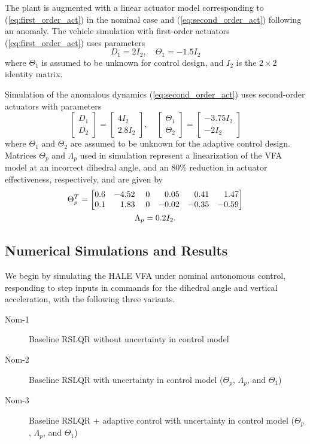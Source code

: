 \documentclass[english]{ifacconf}
\begin{document}
The plant is augmented with a linear actuator model corresponding to (\ref{eq:first_order_act}) in the nominal case and (\ref{eq:second_order_act}) following an anomaly. The vehicle simulation with first-order actuators (\ref{eq:first_order_act}) uses parameters
\begin{equation}
D_1 = 2 I_2, \quad \Theta_1 = -1.5 I_2
\end{equation}
where $\Theta_1$ is assumed to be unknown for control design, and $I_2$ is the $2 \times 2$ identity matrix. 

Simulation of the anomalous dynamics (\ref{eq:second_order_act}) uses second-order actuators with parameters
\begin{equation}
\begin{bmatrix}
	D_1 \\ D_2
\end{bmatrix} = \begin{bmatrix}
	4 I_2 \\ 2.8 I_2
\end{bmatrix}, \quad \begin{bmatrix}
	\Theta_1 \\ \Theta_2 
\end{bmatrix} = \begin{bmatrix}
	-3.75 I_2 \\ -2 I_2
\end{bmatrix}
\end{equation}
where $\Theta_1$ and $\Theta_2$ are assumed to be unknown for the adaptive control design. Matrices $\Theta_p$ and $\Lambda_p$ used in simulation represent a linearization of the VFA model at an incorrect dihedral angle, and an 80\% reduction in actuator effectiveness, respectively, and are given by
\begin{equation}
\begin{gathered}
\Theta_{p}^{T}=\begin{bmatrix}
0.6 & -4.52 & \; 0 & \hfill 0.05 & \hfill 0.41 & \hfill 1.47\\
0.1 & \hfill 1.83 & \; 0 & -0.02 & -0.35 & -0.59
\end{bmatrix}\\ \Lambda_p = 0.2 I_2. \end{gathered}
\end{equation}

\subsection{Numerical Simulations and Results} \label{subsec:sims}
We begin by simulating the HALE VFA under nominal autonomous control, responding to step inputs in commands for the dihedral angle and vertical acceleration, with the following three variants.
\begin{description}
	\item[Nom-1] Baseline RSLQR without uncertainty in control model
	\item[Nom-2] Baseline RSLQR with uncertainty in control model ($\Theta_p$, $\Lambda_p$, and $\Theta_1$)
	\item[Nom-3] Baseline RSLQR + adaptive control with uncertainty in control model ($\Theta_p$, $\Lambda_p$, and $\Theta_1$)
\end{description}
\end{document}
